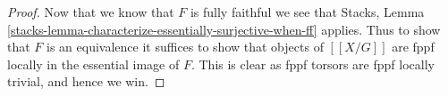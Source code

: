 \begin{proof}
\medskip\noindent
Now that we know that $F$ is fully faithful we see that
Stacks, Lemma \ref{stacks-lemma-characterize-essentially-surjective-when-ff}
applies. Thus to show that $F$ is an equivalence it suffices
to show that objects of $[[X/G]]$ are fppf locally in the essential image
of $F$. This is clear as fppf torsors are fppf locally trivial, and hence
we win.
\end{proof}
